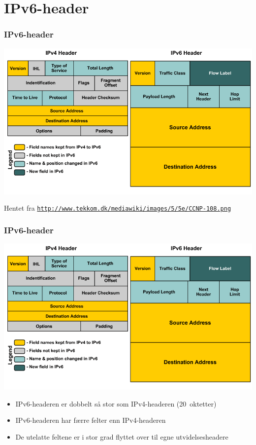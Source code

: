 \section{IPv6-header}
\begin{frame}%
  \frametitle{IPv6-header}
  \pause
  \begin{center}
    \includegraphics[scale=.333]{CCNP-108.png}
  \end{center}

  Hentet fra
  \texttt{\url{http://www.tekkom.dk/mediawiki/images/5/5e/CCNP-108.png}}
\end{frame}

\begin{frame}%
  \frametitle{IPv6-header}
  \begin{center}
    \includegraphics[scale=.25]{CCNP-108.png}
  \end{center}

  \begin{itemize}
  \item IPv6-headeren er dobbelt så stor som IPv4-headeren
    (20~oktetter)
  \item IPv6-headeren har færre felter enn IPv4-headeren
  \item De utelatte feltene er i stor grad flyttet over til egne
    utvidelsesheadere
  \end{itemize}
\end{frame}

